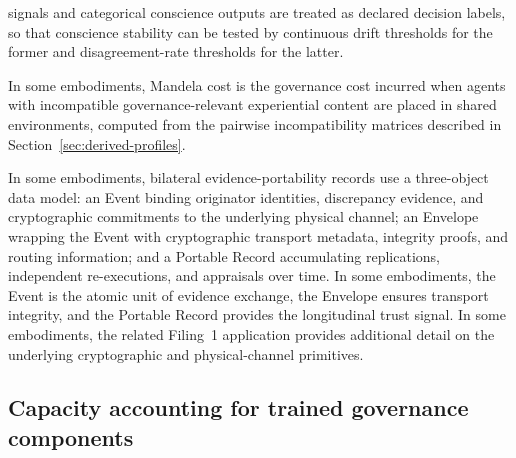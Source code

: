 \documentclass[a4paper,12pt]{article}
\begin{document}
\begin{description}
    signals and categorical conscience outputs are treated as
    declared decision labels, so that conscience stability can be
    tested by continuous drift thresholds for the former and
    disagreement-rate thresholds for the latter.
  \item[Mandela cost.] In some embodiments, Mandela cost is the
    governance cost incurred when agents with incompatible
    governance-relevant experiential content are placed in shared
    environments, computed from the pairwise incompatibility matrices
    described in Section~\ref{sec:derived-profiles}.
  \item[Portable Record, Event, Envelope.] In some embodiments,
    bilateral evidence-portability records use a three-object data
    model: an Event binding originator identities, discrepancy
    evidence, and cryptographic commitments to the underlying
    physical channel; an Envelope wrapping the Event with cryptographic
    transport metadata, integrity proofs, and routing information;
    and a Portable Record accumulating
    replications, independent re-executions, and appraisals over time.
    In some embodiments, the Event is the atomic unit of
    evidence exchange, the Envelope ensures transport integrity, and
    the Portable Record provides the longitudinal trust signal. In
    some embodiments, the related Filing~1 application
    provides additional detail on the underlying cryptographic and
    physical-channel primitives.
\end{description}

\subsection{Capacity accounting for trained governance components}
\label{sec:capacity-accounting-rule-f2}
\end{document}
